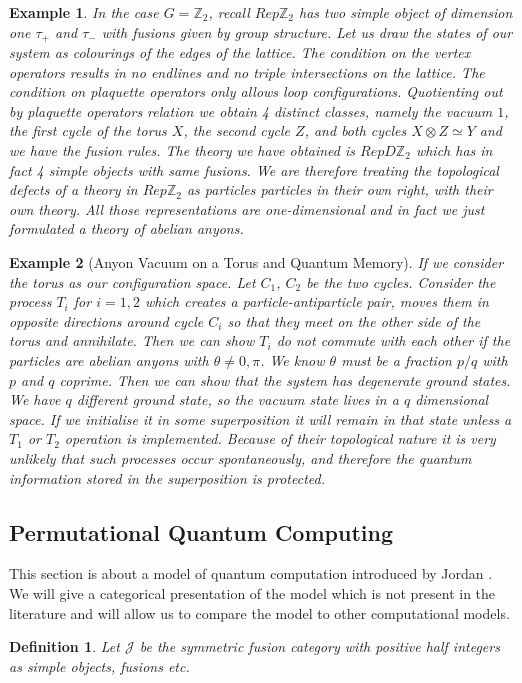 \documentclass{article}
\newtheorem{definition}{Definition}
\newtheorem{example}{Example}
\begin{document}
\begin{example}
	In the case $G=\mathbb{Z}_2$, recall $Rep\mathbb{Z}_2$ has two simple object of dimension one $\tau_+$ and $\tau_-$ with fusions given by group structure. Let us draw the states of our system as colourings of the edges of the lattice. The condition on the vertex operators results in no endlines and no triple intersections on the lattice. The condition on plaquette operators only allows loop configurations. Quotienting out by plaquette operators relation we obtain 4 distinct classes, namely the vacuum $1$, the first cycle of the torus $X$, the second cycle $Z$, and both cycles $X \otimes Z \simeq Y$ and we have the fusion rules. The theory we have obtained is $RepD\mathbb{Z}_2$ which has in fact 4 simple objects with same fusions. We are therefore treating the topological defects of a theory in $Rep\mathbb{Z}_2$ as particles particles in their own right, with their own theory. All those representations are one-dimensional and in fact we just formulated a theory of abelian anyons.
\end{example}

\begin{example}[Anyon Vacuum on a Torus and Quantum Memory]
If we consider the torus as our configuration space. Let $C_1$, $C_2$ be the two cycles. Consider the process $T_i$ for $i=1,2$ which creates a particle-antiparticle pair, moves them in opposite directions around cycle $C_i$ so that they meet on the other side of the torus and annihilate. Then we can show $T_i$ do not commute with each other if the particles are abelian anyons with $\theta \neq 0, \pi$. We know $\theta$ must be a fraction $p/q$ with $p$ and $q$ coprime. Then we can show that the system has degenerate ground states. We have $q$ different ground state, so the vacuum state lives in a $q$ dimensional space. If we initialise it in some superposition it will remain in that state unless a $T_1$ or $T_2$ operation is implemented. Because of their topological nature it is very unlikely that such processes occur spontaneously, and therefore the quantum information stored in the superposition is protected.
\end{example}

\subsection{Permutational Quantum Computing}
This section is about a model of quantum computation introduced by Jordan \cite{Jordan09}. We will give a categorical presentation of the model which is not present in the literature and will allow us to compare the model to other computational models.
\begin{definition}
Let $\mathcal{J}$ be the symmetric fusion category with positive half integers as simple objects, fusions etc.
\end{definition}
\end{document}
